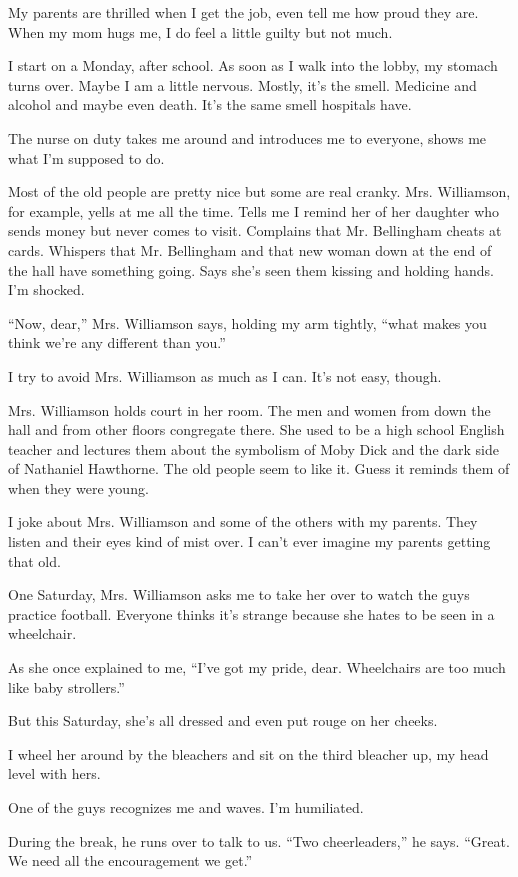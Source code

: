 \documentclass[
]{article}
\begin{document}
My parents are thrilled when I get the job, even tell me how proud they
are. When my mom hugs me, I do feel a little guilty but not much.

I start on a Monday, after school. As soon as I walk into the lobby, my
stomach turns over. Maybe I am a little nervous. Mostly, it's the smell.
Medicine and alcohol and maybe even death. It's the same smell hospitals
have.

The nurse on duty takes me around and introduces me to everyone, shows
me what I'm sup­posed to do.

Most of the old people are pretty nice but some are real cranky. Mrs.
Williamson, for exam­ple, yells at me all the time. Tells me I remind
her of her daughter who sends money but never comes to visit. Complains
that Mr. Bellingham cheats at cards. Whispers that Mr. Bellingham and
that new woman down at the end of the hall have something going. Says
she's seen them kissing and holding hands. I'm shocked.

``Now, dear,'' Mrs. Williamson says, holding my arm tightly, ``what
makes you think we're any different than you.''

I try to avoid Mrs. Williamson as much as I can. It's not easy, though.

Mrs. Williamson holds court in her room. The men and women from down the
hall and from other floors congregate there. She used to be a high
school English teacher and lectures them about the symbolism of {Moby
Dick} and the dark side of Nathaniel Hawthorne. The old people seem to
like it. Guess it reminds them of when they were young.

I joke about Mrs. Williamson and some of the others with my parents.
They listen and their eyes kind of mist over. I can't ever imagine my
parents getting that old.

One Saturday, Mrs. Williamson asks me to take her over to watch the guys
practice football. Everyone thinks it's strange because she hates to be
seen in a wheelchair.

As she once explained to me, ``I've got my pride, dear. Wheelchairs are
too much like baby strollers.''

But this Saturday, she's all dressed and even put rouge on her cheeks.

I wheel her around by the bleachers and sit on the third bleacher up, my
head level with hers.

One of the guys recognizes me and waves. I'm humiliated.

During the break, he runs over to talk to us. ``Two cheerleaders,'' he
says. ``Great. We need all the encouragement we get.''
\end{document}

